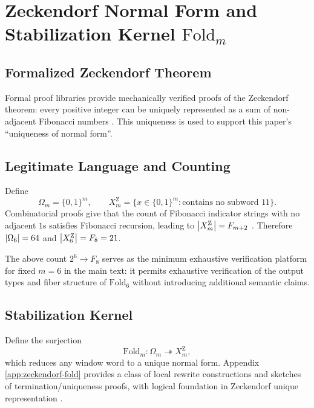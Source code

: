 \section{Zeckendorf Normal Form and Stabilization Kernel \texorpdfstring{$\mathrm{Fold}_m$}{Fold\_m}}
\label{sec:zeckendorf}

\subsection{Formalized Zeckendorf Theorem}

Formal proof libraries provide mechanically verified proofs of the Zeckendorf theorem: every positive integer can be uniquely represented as a sum of non-adjacent Fibonacci numbers \cite{AFPZeckendorf}.
This uniqueness is used to support this paper's ``uniqueness of normal form''.

\subsection{Legitimate Language and Counting}

Define
\[
\Omega_m=\{0,1\}^{m},\qquad
X_m^{\mathrm Z}=\{x\in\{0,1\}^{m}:\text{contains no subword }11\}.
\]
Combinatorial proofs give that the count of Fibonacci indicator strings with no adjacent $1$s satisfies Fibonacci recursion, leading to $\left\lvert X_m^{\mathrm Z}\right\rvert=F_{m+2}$ \cite{PlanetMathZeckendorfCombinatorial}.
Therefore $\left\lvert \Omega_6\right\rvert=64$ and $\left\lvert X_6^{\mathrm Z}\right\rvert=F_8=21$.

\begin{remark}
The above count $2^6\to F_8$ serves as the minimum exhaustive verification platform for fixed $m=6$ in the main text: it permits exhaustive verification of the output types and fiber structure of $\mathrm{Fold}_6$ without introducing additional semantic claims.
\end{remark}

\subsection{Stabilization Kernel}

Define the surjection
\[
\mathrm{Fold}_m:\Omega_m\twoheadrightarrow X_m^{\mathrm Z},
\]
which reduces any window word to a unique normal form. Appendix \ref{app:zeckendorf-fold} provides a class of local rewrite constructions and sketches of termination/uniqueness proofs, with logical foundation in Zeckendorf unique representation \cite{AFPZeckendorf}.
